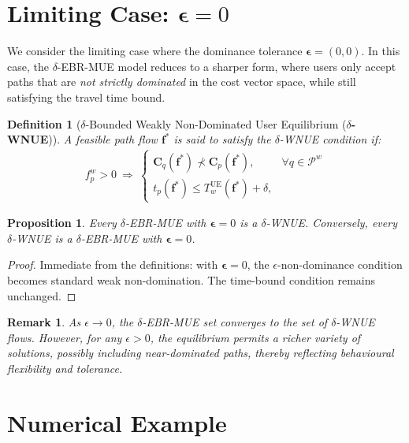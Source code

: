 \documentclass[11pt]{article}
\newtheorem{definition}{Definition}[section]
\newtheorem{proposition}{Proposition}[section]
\newtheorem{remark}{Remark}[section]
\begin{document}
\section{Limiting Case: $\boldsymbol{\epsilon} = 0$}

We consider the limiting case where the dominance tolerance $\boldsymbol{\epsilon} = (0, 0)$. In this case, the $\delta$-EBR-MUE model reduces to a sharper form, where users only accept paths that are \emph{not strictly dominated} in the cost vector space, while still satisfying the travel time bound.

\begin{definition}[{$\delta$-Bounded Weakly Non-Dominated User Equilibrium (\textbf{$\delta$-WNUE})}]
A feasible path flow $\mathbf{f}^*$ is said to satisfy the $\delta$-WNUE condition if:
\begin{align*}
f_p^w > 0 \ \Rightarrow \ 
\begin{cases}
\mathbf{C}_q(\mathbf{f}^*) \not\prec \mathbf{C}_p(\mathbf{f}^*), & \forall q \in \mathcal{P}^w \\[1ex]
t_p(\mathbf{f}^*) \le T_w^{\mathrm{UE}}(\mathbf{f}^*) + \delta, &
\end{cases}
\end{align*}
\end{definition}

\begin{proposition}
Every $\delta$-EBR-MUE with $\boldsymbol{\epsilon} = 0$ is a $\delta$-WNUE. Conversely, every $\delta$-WNUE is a $\delta$-EBR-MUE with $\boldsymbol{\epsilon} = 0$.
\end{proposition}

\begin{proof}
Immediate from the definitions: with $\boldsymbol{\epsilon} = 0$, the $\epsilon$-non-dominance condition becomes standard weak non-domination. The time-bound condition remains unchanged.
\end{proof}

\begin{remark}
As $\epsilon \to 0$, the $\delta$-EBR-MUE set converges to the set of $\delta$-WNUE flows. However, for any $\epsilon > 0$, the equilibrium permits a richer variety of solutions, possibly including near-dominated paths, thereby reflecting behavioural flexibility and tolerance.
\end{remark}


\section{Numerical Example}
\end{document}
